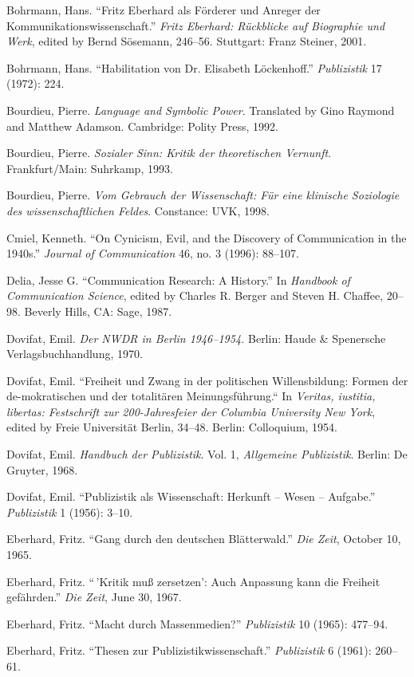 \documentclass{tufte-handout}
\begin{document}
\begin{hangparas}{.25in}{1}
Bohrmann, Hans. ``Fritz Eberhard als Förderer und Anreger der
Kommunikationswissenschaft.'' \emph{Fritz Eberhard: Rückblicke auf
Biographie und Werk}, edited by Bernd Sösemann, 246--56. Stuttgart:
Franz Steiner, 2001.

Bohrmann, Hans. ``Habilitation von Dr. Elisabeth Löckenhoff.''
\emph{Publizistik} 17 (1972): 224.

Bourdieu, Pierre. \emph{Language and Symbolic Power}. Translated by Gino
Raymond and Matthew Adamson. Cambridge: Polity Press, 1992.

Bourdieu, Pierre. \emph{Sozialer Sinn: Kritik der theoretischen
Vernunft}. Frankfurt/Main: Suhrkamp, 1993.

Bourdieu, Pierre. \emph{Vom Gebrauch der Wissenschaft: Für eine
klinische Soziologie des wissenschaftlichen Feldes}. Constance: UVK,
1998.

Cmiel, Kenneth. ``On Cynicism, Evil, and the Discovery of Communication
in the 1940s.'' \emph{Journal of Communication} 46, no. 3 (1996):
88--107.

Delia, Jesse G. ``Communication Research: A History.'' In \emph{Handbook
of Communication Science}, edited by Charles R. Berger and Steven H.
Chaffee, 20--98. Beverly Hills, CA: Sage, 1987.

Dovifat, Emil. \emph{Der NWDR in Berlin 1946--1954.} Berlin: Haude \&
Spenersche Verlagsbuchhandlung, 1970.

Dovifat, Emil. ``Freiheit und Zwang in der politischen Willensbildung:
Formen der de-mokratischen und der totalitären Meinungsführung.`` In
\emph{Veritas, iustitia, libertas: Festschrift zur 200-Jahresfeier der
Columbia University New York}, edited by Freie Universität Berlin,
34--48. Berlin: Colloquium, 1954.

Dovifat, Emil. \emph{Handbuch der Publizistik}. Vol. 1, \emph{Allgemeine
Publizistik}. Berlin: De Gruyter, 1968.

Dovifat, Emil. ``Publizistik als Wissenschaft: Herkunft -- Wesen --
Aufgabe.'' \emph{Publizistik} 1 (1956): 3--10.

Eberhard, Fritz. ``Gang durch den deutschen Blätterwald.'' \emph{Die
Zeit}, October 10, 1965.

Eberhard, Fritz. ``\,'Kritik muß zersetzen': Auch Anpassung kann die
Freiheit gefährden.'' \emph{Die Zeit}, June 30, 1967.

Eberhard, Fritz. ``Macht durch Massenmedien?'' \emph{Publizistik} 10
(1965): 477--94.

Eberhard, Fritz. ``Thesen zur Publizistikwissenschaft.''
\emph{Publizistik} 6 (1961): 260--61.


\end{hangparas}
\end{document}
